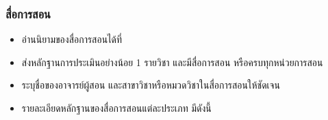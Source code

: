 \documentclass[a4paper,12pt,english]{sphinxmanual}
\begin{document}
\subsubsection{สื่อการสอน}
\label{\detokenize{submission_part1:id5}}\begin{itemize}
\item {} 
อ่านนิยามของสื่อการสอนได้ที่ {\hyperref[\detokenize{glossary:term-4}]{}}

\item {} 
ส่งหลักฐานการประเมินอย่างน้อย 1 รายวิชา และมีสื่อการสอน  หรือครบทุกหน่วยการสอน

\item {} 
ระบุชื่อของอาจารย์ผู้สอน และสาขาวิชาหรือหมวดวิชาในสื่อการสอนให้ชัดเจน

\item {} 
รายละเอียดหลักฐานของสื่อการสอนแต่ละประเภท มีดังนี้

\end{itemize}
\end{document}
